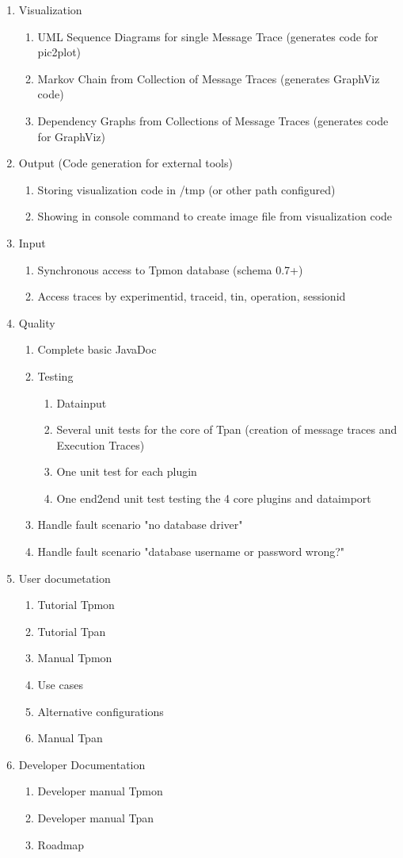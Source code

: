 \documentclass{scrartcl}
\begin{document}
\begin{enumerate}
\item Visualization
\begin{enumerate}
 \item UML Sequence Diagrams for single Message Trace (generates code for pic2plot)
\item Markov Chain from Collection of Message Traces (generates GraphViz code)
\item Dependency Graphs from Collections of Message Traces (generates code for GraphViz)
\end{enumerate}
\item Output (Code generation for external tools)
\begin{enumerate}
 \item Storing visualization code in /tmp (or other path configured)
\item Showing in console command to create image file from visualization code  
\end{enumerate}
\item Input
\begin{enumerate}
\item Synchronous access to Tpmon database (schema 0.7+)
\item Access traces by experimentid, traceid, tin, operation, sessionid 
\end{enumerate}
\item Quality
\begin{enumerate}
 \item Complete basic JavaDoc
\item Testing
\begin{enumerate}
 \item Datainput 
\item Several unit tests for the core of Tpan (creation of message traces and Execution Traces)
\item One unit test for each plugin
\item One end2end unit test testing the 4 core plugins and dataimport
\end{enumerate}
\item Handle fault scenario "no database driver"
\item Handle fault scenario "database username or password wrong?"
\end{enumerate}
\item User documetation
\begin{enumerate}
 \item Tutorial Tpmon
\item Tutorial Tpan
\item Manual Tpmon
\item Use cases
\item Alternative configurations
\item Manual Tpan
\end{enumerate}

\item Developer Documentation
\begin{enumerate}
\item Developer manual Tpmon
\item Developer manual Tpan
\item Roadmap
\end{enumerate}
\end{enumerate}
\end{document}
